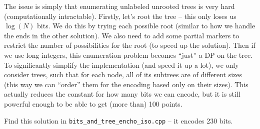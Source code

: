 \documentclass[12pt]{article}
\begin{document}
The issue is simply that enumerating unlabeled unrooted trees is very hard (computationally intractable). Firstly, let's root the tree -- this only loses us $\log(N)$ bits. We do this by trying each possible root (similar to how we handle the ends in the other solution). We also need to add some partial markers to restrict the number of possibilities for the root (to speed up the solution). Then if we use long integers, this enumeration problem becomes ``just'' a DP on the tree. To significantly simplify the implementation (and speed it up a lot), we only consider trees, such that for each node, all of its subtrees are of different sizes (this way we can ``order'' them for the encoding based only on their sizes). This actually reduces the constant for how many bits we can encode, but it is still powerful enough to be able to get (more than) 100 points.

Find this solution in \verb|bits_and_tree_encho_iso.cpp| -- it encodes 230 bits.
\end{document}
